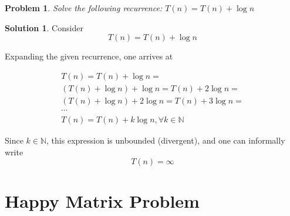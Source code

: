 \documentclass[12pt]{article}
\newtheorem*{problem}{Problem}
\theoremstyle{definition}
\newtheorem*{solution}{Solution}
\begin{document}
\begin{problem}
Solve the following recurrence: $T(n)=T(n)+\log n$
\end{problem}
\begin{solution}
	Consider 
	$$
	T(n) = T(n) + \log n
	$$
	
	Expanding the given recurrence, one arrives at 
	
	\begin{gather*}
		T(n) = T(n) + \log n = \\
		(T(n) + \log n) + \log n = T(n) + 2 \log n = \\
		(T(n) + \log n) + 2 \log n = T(n) + 3 \log n = \\
		\cdots \\
		T(n) = T(n) + k \log n, \forall k \in \mathbb N
	\end{gather*}
	
	Since $k \in \mathbb N$, this expression is unbounded (divergent), and one can
	informally write
	$$
	T(n) = \infty
	$$
\end{solution}

\section{Happy Matrix Problem}
\end{document}
